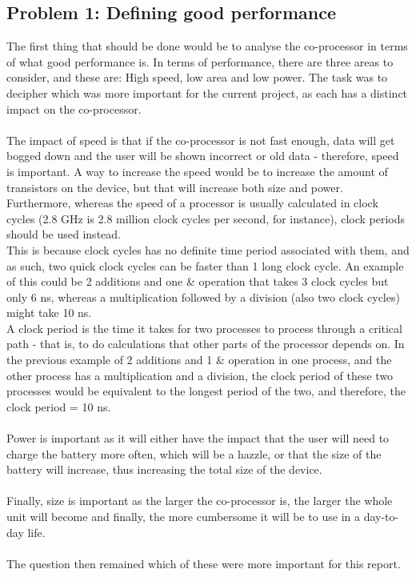 \documentclass[12pt,a4paper]{article}
\begin{document}
\subsection{Problem 1: Defining good performance}
	The first thing that should be done would be to analyse the co-processor in terms of what good performance is. In terms of performance, there are three areas to consider, and these are: High speed, low area and low power. The task was to decipher which was more important for the current project, as each has a distinct impact on the co-processor.\\
	\\
	The impact of speed is that if the co-processor is not fast enough, data will get bogged down and the user will be shown incorrect or old data - therefore, speed is important. A way to increase the speed would be to increase the amount of transistors on the device, but that will increase both size and power.\\
	Furthermore, whereas the speed of a processor is usually calculated in clock cycles (2.8 GHz is 2.8 million clock cycles per second, for instance), clock periods should be used instead.\\
	This is because clock cycles has no definite time period associated with them, and as such, two quick clock cycles can be faster than 1 long clock cycle. An example of this could be 2 additions and one \& operation that takes 3 clock cycles but only 6 ns, whereas a multiplication followed by a division (also two clock cycles) might take 10 ns.\\
	A clock period is the time it takes for two processes to process through a critical path - that is, to do calculations that other parts of the processor depends on. In the previous example of 2 additions and 1 \& operation in one process, and the other process has a multiplication and a division, the clock period of these two processes would be equivalent to the longest period of the two, and therefore, the clock period = 10 ns.\\
	\\
	Power is important as it will either have the impact that the user will need to charge the battery more often, which will be a hazzle, or that the size of the battery will increase, thus increasing the total size of the device.\\
	\\
	Finally, size is important as the larger the co-processor is, the larger the whole unit will become and finally, the more cumbersome it will be to use in a day-to-day life.\\
	\\
	The question then remained which of these were more important for this report.\\
	
\end{document}
